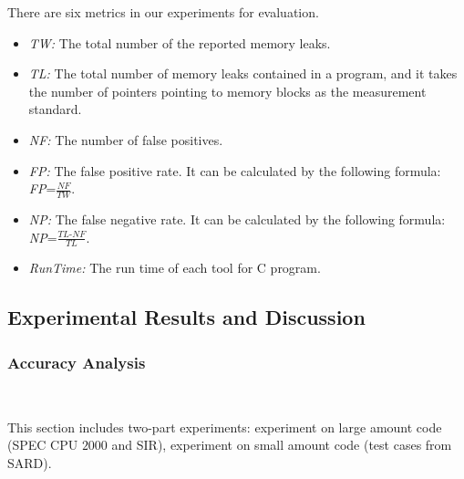 There are six metrics in our experiments for evaluation.
\begin{itemize}
\item \textit{TW:} The total number of the reported memory leaks.
\item \textit{TL:} The total number of memory leaks contained in a program, and it takes the number of pointers pointing to memory blocks as the measurement standard.
\item \textit{NF:} The number of false positives.
\item \textit{FP:} The false positive rate. It can be calculated by the following formula: \textit{FP}=$\frac{\textit{NF}}{\textit{TW}}$.
\item \textit{NP:} The false negative rate. It can be calculated by the following formula: \textit{NP}=$\frac{\textit{TL-NF}}{\textit{TL}}$.
\item \textit{RunTime:} The run time of each tool for C program.
\end{itemize}
\subsection{Experimental Results and Discussion}


\subsubsection{Accuracy Analysis}

\ 

This section includes two-part experiments: experiment on large amount code (SPEC CPU $2000$ and SIR), experiment on small amount code (test cases from SARD).

